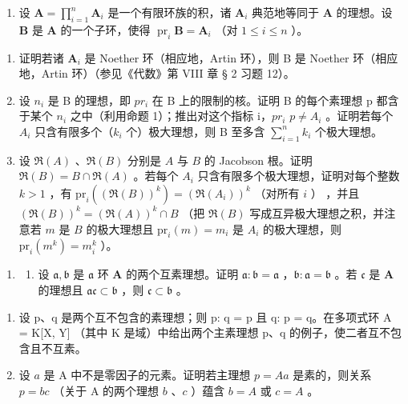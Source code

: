 \begin{enumerate}
\def\labelenumi{\arabic{enumi}.}
\setcounter{enumi}{6}
\tightlist
\item
  设 \(\mathbf{A} = \prod_{i=1}^{n} \mathbf{A}_i\) 是一个有限环族的积，诸 \(\mathbf{A}_i\) 典范地等同于 \(\mathbf{A}\) 的理想。设 \(\mathbf{B}\) 是 \(\mathbf{A}\) 的一个子环，使得 \(\operatorname{pr}_i \mathbf{B} = \mathbf{A}_i\) （对 \(1 \leqslant i \leqslant n\) ）。
\end{enumerate}

\begin{enumerate}
\def\labelenumi{(\alph{enumi})}
\item
  证明若诸 \(\mathbf{A}_i\) 是 Noether 环（相应地，Artin 环），则 B 是 Noether 环（相应地，Artin 环）（参见《代数》第 VIII 章 § 2 习题 12）。
\item
  设 \(n_{i}\) 是 B 的理想，即 \(pr_{i}\) 在 B 上的限制的核。证明 B 的每个素理想 p 都含于某个 \(n_{i}\) 之中（利用命题 1）；推出对这个指标 i，\(pr_{i}\) \(p \neq A_{i}\) 。证明若每个 \(A_{i}\) 只含有限多个（\(k_{i}\) 个）极大理想，则 B 至多含 \(\sum_{i=1}^{n} k_{i}\) 个极大理想。
\item
  设 \(\Re(A)\) 、\(\Re(B)\) 分别是 \(A\) 与 \(B\) 的 Jacobson 根。证明 \(\Re(B) = B \cap \Re(A)\) 。若每个 \(A_i\) 只含有限多个极大理想，证明对每个整数 \(k > 1\) ，有 \(\mathrm{pr}_i((\Re(B))^k) = (\Re(A_i))^k\) （对所有 \(i\) ） ，并且 \((\Re(B))^k = (\Re(A))^k \cap B\) （把 \(\Re(B)\) 写成互异极大理想之积，并注意若 \(m\) 是 \(B\) 的极大理想且 \(\mathrm{pr}_i(m) = m_i\) 是 \(A_i\) 的极大理想，则 \(\mathrm{pr}_i(m^k) = m_i^k\) ）。
\end{enumerate}

\begin{enumerate}
\def\labelenumi{\arabic{enumi}.}
\setcounter{enumi}{7}
\tightlist
\item
  \begin{enumerate}
  \def\labelenumii{(\alph{enumii})}
  \tightlist
  \item
    设 \(\mathfrak{a}, \mathfrak{b}\) 是 \(\mathfrak{a}\) 环 \(\mathbf{A}\) 的两个互素理想。证明 \(\mathfrak{a}: \mathfrak{b} = \mathfrak{a}\) ，\(\mathfrak{b}: \mathfrak{a} = \mathfrak{b}\) 。若 \(\mathfrak{c}\) 是 \(\mathbf{A}\) 的理想且 \(\mathfrak{ac} \subset \mathfrak{b}\) ，则 \(\mathfrak{c} \subset \mathfrak{b}\) 。
  \end{enumerate}
\end{enumerate}

\begin{enumerate}
\def\labelenumi{(\alph{enumi})}
\setcounter{enumi}{1}
\item
  设 p、q 是两个互不包含的素理想；则 p: q = p 且 q: p = q。在多项式环 A = K{[}X, Y{]} （其中 K 是域）中给出两个主素理想 p、q 的例子，使二者互不包含且不互素。
\item
  设 \(a\) 是 A 中不是零因子的元素。证明若主理想 \(p = Aa\) 是素的，则关系 \(p = bc\) （关于 A 的两个理想 \(b\) 、\(c\) ）蕴含 \(b = A\) 或 \(c = A\) 。
\end{enumerate}

